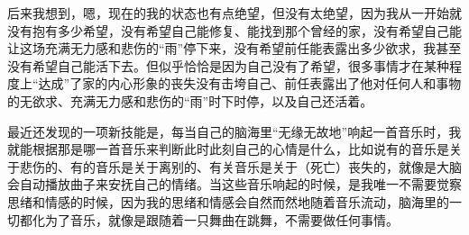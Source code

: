 后来我想到，嗯，现在的我的状态也有点绝望，但没有太绝望，因为我从一开始就没有抱有多少希望，没有希望自己能修复、能找到那个曾经的家，没有希望自己能让这场充满无力感和悲伤的“雨”停下来，没有希望前任能表露出多少欲求，我甚至没有希望自己能活下去。但似乎恰恰是因为自己没有了希望，很多事情才在某种程度上“达成”了\pozhehao{}家的内心形象的丧失没有击垮自己、前任表露出了他对任何人和事物的无欲求、充满无力感和悲伤的“雨”时下时停，以及自己还活着。

最近还发现的一项新技能是，每当自己的脑海里“无缘无故地”响起一首音乐时，我就能根据那是哪一首音乐来判断此时此刻自己的心情是什么，比如说有的音乐是关于悲伤的、有的音乐是关于离别的、有关音乐是关于（死亡）丧失的，就像是大脑会自动播放曲子来安抚自己的情绪。当这些音乐响起的时候，是我唯一不需要觉察思绪和情感的时候，因为我的思绪和情感会自然而然地随着音乐流动，脑海里的一切都化为了音乐，就像是跟随着一只舞曲在跳舞，不需要做任何事情。

\noindent\begin{minipage}{\linewidth}
	\center

	\noindent{}
	\vspace{8pt}

	\noindent{}
	\vspace{8pt}

	\noindent{}


\end{minipage}






